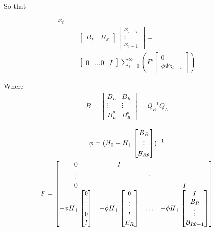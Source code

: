 \documentclass{elsart}
\begin{document}
\begin{prf}
So that 

\begin{equation*}
  \begin{split}
x_{t} = &\\
&\begin{bmatrix}
B_L& B_R  
\end{bmatrix}
\begin{bmatrix}
     x_{t-\tau}\\ \vdots\\ x_{t-1}
  \end{bmatrix} + \\
&  \begin{bmatrix}
  0&\dots 0&I
  \end{bmatrix}
\sum_{s=0}^\infty  ( F^{s} 
\begin{bmatrix}
0\\
\phi \Psi z_{t+s}  
\end{bmatrix})\label{basic}
  \end{split}
\end{equation*}

Where
\begin{gather}
B=  \begin{bmatrix}
B_L&B_R\\
\vdots&\vdots\\
B_L^\theta&B_R^\theta
  \end{bmatrix}
= Q_R^{-1} Q_L
\end{gather}


\begin{gather}
  \phi=  (H_0 + H_+  \begin{bmatrix}
    B_R\\\vdots\\\mathcal{B}_{R\theta}
  \end{bmatrix})^{-1}\\
F=
\begin{bmatrix}
0&I\\
\vdots&&\ddots\\
0&&&I\\
-\phi H_+\begin{bmatrix}
0\\ \vdots \\ 0\\I
  \end{bmatrix}&
-\phi H_+\begin{bmatrix}
0\\ \vdots\\I\\B_R
  \end{bmatrix}&\ldots&
-\phi H_+\begin{bmatrix}
I\\B_R\\\vdots\\\mathcal{B}_{R\theta-1}
  \end{bmatrix}
\end{bmatrix}
\end{gather}


\end{prf}
\end{document}
